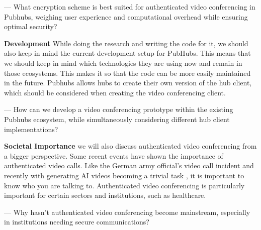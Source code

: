 \documentclass[11pt,a4paper]{article}
\begin{document}
    — What encryption scheme is best suited for authenticated video conferencing in Pubhubs, weighing user experience
    and computational overhead while ensuring optimal security?

    \textbf{Development}
    While doing the research and writing the code for it, we should also keep in mind the current development setup for
    PubHubs. This means that we should keep in mind which technologies they are using now and remain in those
    ecosystems. This makes it so that the code can be more easily maintained in the future. Pubhubs allows hubs to
    create their own version of the hub client, which should be considered when creating the video conferencing client.

    — How can we develop a video conferencing prototype within the existing Pubhubs ecosystem, while simultaneously
    considering different hub client implementations?

    \textbf{Societal Importance}
    we will also discuss authenticated video conferencing from a bigger perspective. Some recent events have shown the
    importance of authenticated video calls. Like the German army official's video call incident \cite{GERMAN}
    and recently with generating AI videos becoming a trivial task \cite{SORA}\cite{HEYGEN}
    , it is important to know who you are talking to. Authenticated video conferencing is particularly important for
    certain sectors and institutions, such as healthcare.

    — Why hasn't authenticated video conferencing become mainstream, especially in institutions needing secure
    communications?

    
    
\end{document}
